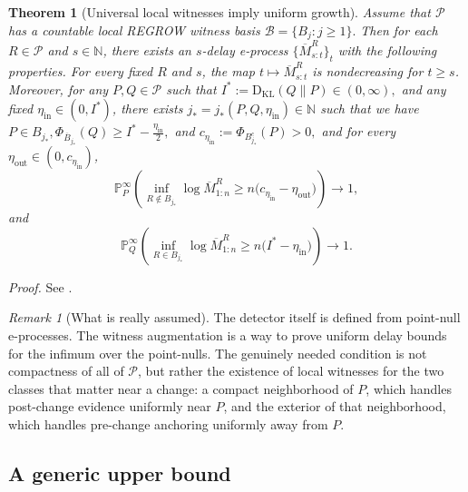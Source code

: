 \documentclass[12pt]{article}
\theoremstyle{spaced}
\newtheorem{theorem}{Theorem}[section]
\theoremstyle{remark}
\newtheorem{remark}[remark]{Remark}
\newcommand{\N}{\mathbb N}
\newcommand{\calP}{\mathcal P}
\newcommand{\KL}{\mathrm{D}_{\text{KL}}}
\begin{document}
\begin{theorem}[Universal local witnesses imply uniform growth]
\label{thm:witness-implies-growth}
Assume that $\calP$ has a countable local REGROW
witness basis $\mathscr B=\{B_j:j\ge1\}.$
Then for each $R\in\calP$ and $s\in\N$, there exists an $s$-delay e-process $\{\overline M_{s:t}^{R}\}_t$ with the following properties. For every fixed $R$ and $s$, the map
$t\mapsto\overline M_{s:t}^{R}$ is nondecreasing for $t\ge s$.
Moreover, for any $P,Q\in\calP$ such that
$I^*:=\KL(Q\|P)\in(0,\infty),$
and any fixed $\eta_{\mathrm{in}}\in(0,I^*)$,  there exists
$j_*=j_*(P,Q,\eta_{\mathrm{in}})\in\N$ such that
we have
$ P\in B_{j_*},
    \Phi_{\overline B_{j_*}}(Q)
    \ge
    I^*-\frac{\eta_{\mathrm{in}}}{2},$
and
$c_{\eta_{\mathrm{in}}}
    :=
    \Phi_{B_{j_*}^c}(P)
    >0,$
and for every
$\eta_{\mathrm{out}}\in(0,c_{\eta_{\mathrm{in}}})$,
\begin{equation}
\label{eq:pre-growth}
    \mathbb P_P^\infty
    \left(
        \inf_{R\notin B_{j_*}}
        \log\overline M_{1:n}^{R}
        \ge
        n\bigl(c_{\eta_{\mathrm{in}}}
        -\eta_{\mathrm{out}}\bigr)
    \right)
    \longrightarrow1,
\end{equation}
and
\begin{equation}
\label{eq:post-growth}
    \mathbb P_Q^\infty
    \left(
        \inf_{R\in B_{j_*}}
        \log\overline M_{1:n}^{R}
        \ge
        n\bigl(I^*-\eta_{\mathrm{in}}\bigr)
    \right)
    \longrightarrow1.
\end{equation}
\end{theorem}
\emph{Proof.} See .


\begin{remark}[What is really assumed]
The detector itself is defined from point-null e-processes.  The witness augmentation is a way to prove uniform delay bounds for the infimum over the point-nulls.  The genuinely needed condition is not compactness of all of $\calP$, but rather the existence of local witnesses for the two classes that matter near a change: a compact neighborhood of $P$, which handles post-change evidence uniformly near $P$, and the exterior of that neighborhood, which handles pre-change anchoring uniformly away from $P$.
\end{remark}


\subsection{A generic upper bound}
\end{document}
